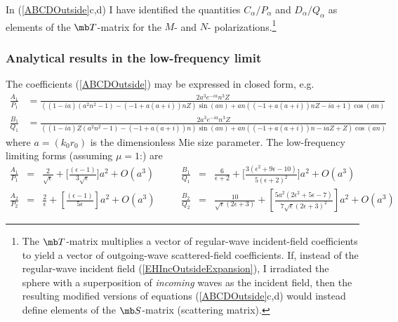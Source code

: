 \documentclass[letterpaper]{article}
\begin{document}
In (\ref{ABCDOutside}c,d) I have identified
the quantities $C_\alpha/P_\alpha$ and $D_\alpha/Q_\alpha$
as elements of the $\mb T$-matrix for the $M$- and $N$- 
polarizations.\footnote{The $\mb T$-matrix multiplies a vector
of regular-wave incident-field coefficients to yield 
a vector of outgoing-wave scattered-field coefficients.
If, instead of the regular-wave incident field 
(\ref{EHIncOutsideExpansion}), I irradiated the sphere with
a superposition of \textit{incoming} waves as the incident field,
then the resulting modified versions of equations (\ref{ABCDOutside}c,d)
would instead define elements of the $\mb S$-matrix (scattering matrix).}

\subsubsection{Analytical results in the low-frequency limit}

The coefficients (\ref{ABCDOutside}) may be expressed in closed form, e.g.
\begin{align*}
 \frac{A_1}{P_1}
&=
   \frac{2 a^3 e^{-i a} n^3 Z}{\left((1-i a) \left(a^2 n^2-1\right)-(-1+a (a+i))
    n Z\right) \sin (a n)+a n ((-1+a (a+i)) n Z-i a+1) \cos (a n)}
\\
 \frac{B_1}{Q_1}
&=
  \frac{2 a^3 e^{-i a} n^3 Z}{\left((1-i a) Z \left(a^2 n^2-1\right)-(-1+a
    (a+i)) n\right) \sin (a n)+a n ((-1+a (a+i)) n-i a Z+Z) \cos (a n)}
\end{align*}
where $a=(k_0 r_0)$ is the dimensionless Mie size parameter.
The low-frequency limiting forms (assuming $\mu=1$:) are 
$$ \begin{array}{lclclcl}
 \displaystyle{
 \frac{A_1}{P_1}
              }
&=& 
 \displaystyle{
   \frac{2}{\sqrt{\epsilon}}
   +
   \Big[\frac{(\epsilon-1)}{3\sqrt{\epsilon}}\Big] a^2
   +O(a^3)
              }
&\quad&
 \displaystyle{
 \frac{B_1}{Q_1}
              }
&=& 
 \displaystyle{
    \frac{6}{\epsilon+2}
   +
   \Big[
   \frac{3 \left(\epsilon^2+9\epsilon-10\right)}{5 (\epsilon+2)^2}
   \Big]a^2
   +O(a^3)
              }
\\[12pt]
 \displaystyle{
\frac{A_2}{P_2}
              }
&=&
 \displaystyle{
   \frac{2}{\epsilon}
   +\left[ \frac{(\epsilon-1)}{5\epsilon}\right]a^2
   +O(a^3)
              }
&\quad&
 \displaystyle{
\frac{B_2}{Q_2}
              }
&=&
 \displaystyle{
   \frac{10}{\sqrt{\epsilon} (2 \epsilon+3)}
  +
   \left[ \frac{5 a^2 \left(2\epsilon^2+5 \epsilon-7\right)}
               {7 \sqrt{\epsilon} (2 \epsilon+3)^2}
   \right] a^2 
  +O(a^3)
              }
\end{array}$$
\end{document}
